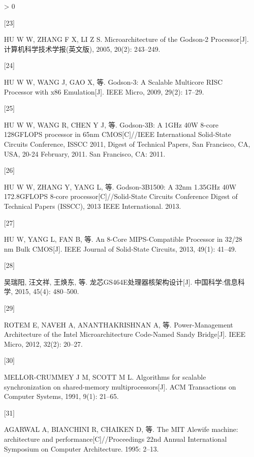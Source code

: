 \documentclass[]{ctexbook}
\newlength{\cslhangindent}
\newlength{\csllabelwidth}
\newenvironment{CSLReferences}[3] %
 {%
  \setlength{\parindent}{0pt}
  \ifodd #1 \everypar{\setlength{\hangindent}{\cslhangindent}}\ignorespaces\fi
  \ifnum #2 > 0
  \setlength{\parskip}{#3\baselineskip}
  \fi
 }%
 {}
\newcommand{\CSLLeftMargin}[1]{\parbox[t]{\maxof{\widthof{#1}}{\csllabelwidth}}{#1}}
\newcommand{\CSLRightInline}[1]{\parbox[t]{\linewidth}{#1}}
\begin{document}
\begin{CSLReferences}{0}{0}
\leavevmode\hypertarget{ref-hu_microarchitecture_2005}{}%
\CSLLeftMargin{{[}23{]} }
\CSLRightInline{HU W W, ZHANG F X, LI Z S. Microarchitecture of the {Godson}-2 {Processor}{[}J{]}. 计算机科学技术学报(英文版), 2005, 20(2): 243--249.}

\leavevmode\hypertarget{ref-hu_godson-3_2009}{}%
\CSLLeftMargin{{[}24{]} }
\CSLRightInline{HU W W, WANG J, GAO X, 等. Godson-3: {A} {Scalable} {Multicore} {RISC} {Processor} with x86 {Emulation}{[}J{]}. IEEE Micro, 2009, 29(2): 17--29.}

\leavevmode\hypertarget{ref-hu_godson-3b_2011}{}%
\CSLLeftMargin{{[}25{]} }
\CSLRightInline{HU W W, WANG R, CHEN Y J, 等. Godson-{3B}: {A} {1GHz} {40W} 8-core {128GFLOPS} processor in 65nm {CMOS}{[}C{]}//{IEEE} {International} {Solid}-{State} {Circuits} {Conference}, {ISSCC} 2011, {Digest} of {Technical} {Papers}, {San} {Francisco}, {CA}, {USA}, 20-24 {February}, 2011. San Francisco, CA: 2011.}

\leavevmode\hypertarget{ref-hu_godson-3b1500_2013}{}%
\CSLLeftMargin{{[}26{]} }
\CSLRightInline{HU W W, ZHANG Y, YANG L, 等. Godson-{3B1500}: {A} 32nm 1.{35GHz} {40W} 172.{8GFLOPS} 8-core processor{[}C{]}//Solid-{State} {Circuits} {Conference} {Digest} of {Technical} {Papers} ({ISSCC}), 2013 {IEEE} {International}. 2013.}

\leavevmode\hypertarget{ref-hu_8-core_2013}{}%
\CSLLeftMargin{{[}27{]} }
\CSLRightInline{HU W, YANG L, FAN B, 等. An 8-{Core} {MIPS}-{Compatible} {Processor} in 32/28 nm {Bulk} {CMOS}{[}J{]}. IEEE Journal of Solid-State Circuits, 2013, 49(1): 41--49.}

\leavevmode\hypertarget{ref-_gs464e_2015}{}%
\CSLLeftMargin{{[}28{]} }
\CSLRightInline{吴瑞阳, 汪文祥, 王焕东, 等. {龙芯GS464E处理器核架构设计}{[}J{]}. 中国科学:信息科学, 2015, 45(4): 480--500.}

\leavevmode\hypertarget{ref-rotem_power-management_2012}{}%
\CSLLeftMargin{{[}29{]} }
\CSLRightInline{ROTEM E, NAVEH A, ANANTHAKRISHNAN A, 等. Power-{Management} {Architecture} of the {Intel} {Microarchitecture} {Code}-{Named} {Sandy} {Bridge}{[}J{]}. IEEE Micro, 2012, 32(2): 20--27.}

\leavevmode\hypertarget{ref-mellor-crummey_algorithms_1991}{}%
\CSLLeftMargin{{[}30{]} }
\CSLRightInline{MELLOR-CRUMMEY J M, SCOTT M L. Algorithms for scalable synchronization on shared-memory multiprocessors{[}J{]}. ACM Transactions on Computer Systems, 1991, 9(1): 21--65.}

\leavevmode\hypertarget{ref-agarwal_mit_1995}{}%
\CSLLeftMargin{{[}31{]} }
\CSLRightInline{AGARWAL A, BIANCHINI R, CHAIKEN D, 等. The {MIT} {Alewife} machine: architecture and performance{[}C{]}//Proceedings 22nd {Annual} {International} {Symposium} on {Computer} {Architecture}. 1995: 2--13.}


\end{CSLReferences}
\end{document}
